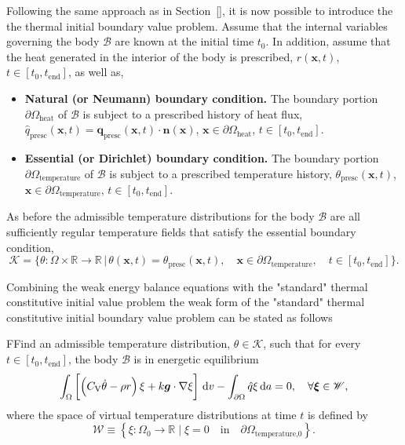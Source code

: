 Following the same approach as in Section~\ref{}, it is now possible to introduce the the thermal initial boundary value problem.
Assume that the internal variables governing the body \(\mathcal B\) are known at the initial time \(t_0\).
In addition, assume that the heat generated in the interior of the body is prescribed, \(r(\bm x, t)\), \(t\in[t_0, t_\text{end}]\), as well as,
\begin{itemize}
  \item \textbf{Natural (or Neumann) boundary condition.} The boundary portion \(\partial \Omega_\text{heat}\) of \(\mathcal B\) is subject to a prescribed history of heat flux, \(\hat q_\text{presc}(\bm x, t) = \bm q_\text{presc}(\bm x, t)\cdot \bm n(\bm x)\), \(\bm x \in \partial \Omega_\text{heat}\), \(t\in [t_0,t_\text{end}]\).
  \item \textbf{Essential (or Dirichlet) boundary condition.} The boundary portion \(\partial \Omega_\text{temperature}\) of \(\mathcal B\) is subject to a prescribed temperature history, \(\theta_\text{presc}(\bm x, t)\), \(\bm x \in \partial \Omega_\text{temperature}\), \(t\in [t_0,t_\text{end}]\).
\end{itemize}

As before the admissible temperature distributions for the body \(\mathcal B\) are all sufficiently regular temperature fields that satisfy the essential boundary condition,
\begin{equation}
  \mathscr K = \{\theta:\Omega \times \mathbb R \to \mathbb R\,|\,\theta(\bm x, t) = \theta_\text{presc}(\bm x, t),\quad \bm x\in \partial \Omega_\text{temperature},\quad t\in[t_0, t_\text{end}]\}.
\end{equation}

Combining the weak energy balance equations with the "standard" thermal constitutive initial value problem the weak form of the "standard" thermal constitutive initial boundary value problem can be stated as follows
 \begin{problem}
     FFind an admissible temperature distribution, $\theta \in \mathscr{K}$, such that for every $t\in [t_0,t_\text{end}]$, the body $\mathscr{B}$ is in energetic equilibrium
         \begin{equation}
         \int_\Omega   \left[\left(C_\mathrm{V} \dot \theta - \rho r\right) \xi +k\bm g\cdot \nabla \xi\right]\,\mathrm{d} v - \int_{\partial\Omega} \hat q \xi\,\mathrm{d} a = 0,\quad \forall \bm{\xi} \in \mathscr{W},
     \end{equation}
     where the space of virtual temperature distributions at time $t$ is defined by
     \begin{equation}
         \mathscr{W} \equiv \left\{\xi:\Omega_0\to \mathbb R\;|\;\xi = 0\quad \text{in}\quad \partial\Omega_\text{temperature,0}\right\}.
     \end{equation}
 \end{problem}

